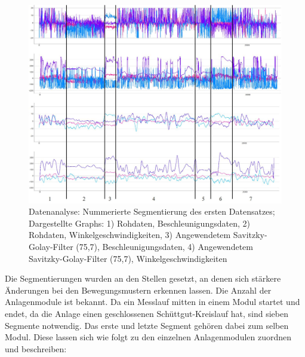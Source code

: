\begin{figure}[htb]
	\centering
	\includegraphics[width=1\linewidth]{images/k5-segmentierung.JPG}
	\caption{Datenanalyse: Nummerierte Segmentierung des ersten Datensatzes; Dargestellte Graphs: 1) Rohdaten, Beschleunigungsdaten, 2) Rohdaten, Winkelgeschwindigkeiten, 3) Angewendetem Savitzky-Golay-Filter (75,7), Beschleunigungsdaten, 4) Angewendetem Savitzky-Golay-Filter (75,7), Winkelgeschwindigkeiten}
	\label{fig:k5_segmentierung}
\end{figure}

Die Segmentierungen wurden an den Stellen gesetzt, an denen sich stärkere Änderungen bei den Bewegungsmustern erkennen lassen. Die Anzahl der Anlagenmodule ist bekannt. Da ein Messlauf mitten in einem Modul startet und endet, da die Anlage einen geschlossenen Schüttgut-Kreislauf hat, sind sieben Segmente notwendig. Das erste und letzte Segment gehören dabei zum selben Modul. Diese lassen sich wie folgt zu den einzelnen Anlagenmodulen zuordnen und beschreiben:

